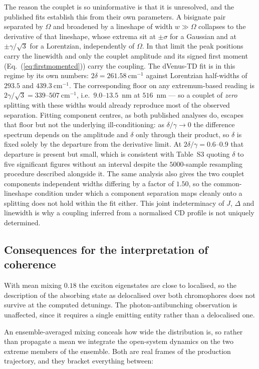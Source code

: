\documentclass[journal=jpcbfk, manuscript=article, layout=twocolumn, doi=true]{achemso}
\begin{document}
The reason the couplet is so uninformative is that it is unresolved, and the
published fits establish this from their own parameters. A bisignate pair
separated by $\Omega$ and broadened by a lineshape of width $w \gg \Omega$
collapses to the derivative of that lineshape, whose extrema sit at
$\pm\sigma$ for a Gaussian and at $\pm\gamma/\sqrt{3}$ for a Lorentzian,
independently of $\Omega$. In that limit the peak positions carry the linewidth
and only the couplet amplitude and its signed first moment
(Eq.~(\ref{eq:firstmomentcd})) carry the coupling. The dVenus-TD fit is in this
regime by its own numbers: $2\delta = 261.58~\mathrm{cm^{-1}}$ against
Lorentzian half-widths of $293.5$ and $439.3~\mathrm{cm^{-1}}$. The
corresponding floor on any extremum-based reading is
$2\gamma/\sqrt{3} = 339$--$507~\mathrm{cm^{-1}}$, i.e.\ $9.0$--$13.5$~nm at
$516$~nm --- so a couplet of \emph{zero} splitting with these widths would
already reproduce most of the observed separation. Fitting component centres,
as both published analyses do, escapes that floor but not the underlying
ill-conditioning: as $\delta/\gamma \to 0$ the difference spectrum depends on
the amplitude and $\delta$ only through their product, so $\delta$ is fixed
solely by the departure from the derivative limit. At
$2\delta/\gamma = 0.6$--$0.9$ that departure is present but small, which is
consistent with Table~S3 quoting $\delta$ to five significant figures without
an interval despite the $5000$-sample resampling procedure described alongside
it. The same analysis also gives the two couplet components independent widths
differing by a factor of $1.50$, so the common-lineshape condition under which
a component separation maps cleanly onto a splitting does not hold within the
fit either. This joint indeterminacy of $J$, $\Delta$ and linewidth is why a
coupling inferred from a normalised CD profile is not uniquely determined.

\subsection{Consequences for the interpretation of coherence}

With mean mixing $0.18$ the exciton eigenstates are close to localised, so the
description of the absorbing state as delocalised over both chromophores does
not survive at the computed detunings. The photon-antibunching
observation\cite{kim2019venusa206} is unaffected, since it requires a single
emitting entity rather than a delocalised one.

An ensemble-averaged mixing conceals how wide the distribution is, so rather
than propagate a mean we integrate the open-system dynamics on the two extreme
members of the ensemble. Both are real frames of the production trajectory, and
they bracket everything between:
\end{document}
